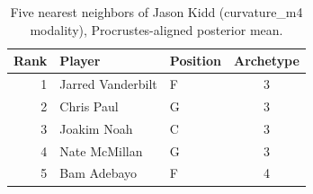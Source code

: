 \begin{table}[htbp]
  \centering\small
  \begin{tabular}{rllc}
    \toprule
    Rank & Player & Position & Archetype \\
    \midrule
    1 & Jarred Vanderbilt & F & 3 \\
    2 & Chris Paul & G & 3 \\
    3 & Joakim Noah & C & 3 \\
    4 & Nate McMillan & G & 3 \\
    5 & Bam Adebayo & F & 4 \\
    \bottomrule
  \end{tabular}
  \caption{Five nearest neighbors of Jason Kidd (curvature_m4 modality), Procrustes-aligned posterior mean.}
  \label{tab:Jason_Kidd_neighbors_curvature_m4}
\end{table}

